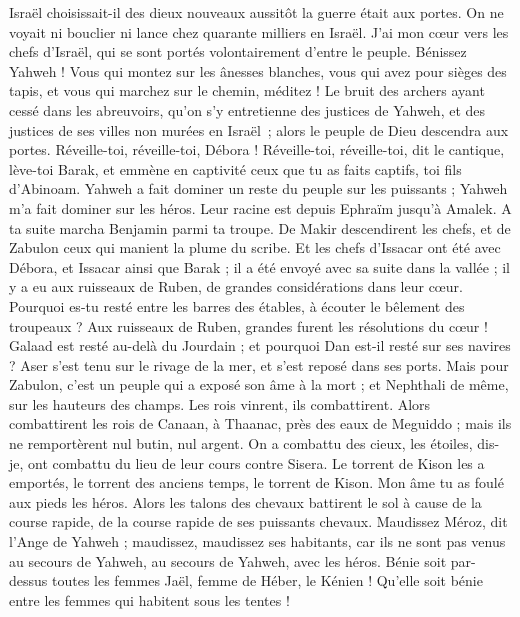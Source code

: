 \begin{multicols}{2}
Israël choisissait-il des dieux nouveaux aussitôt la guerre était aux portes. On ne voyait ni bouclier ni lance chez quarante milliers en Israël.
J’ai mon cœur vers les chefs d'Israël, qui se sont portés volontairement d’entre le peuple. Bénissez Yahweh !
Vous qui montez sur les ânesses blanches, vous qui avez pour sièges des tapis, et vous qui marchez sur le chemin, méditez !
Le bruit des archers ayant cessé dans les abreuvoirs, qu’on s’y entretienne des justices de Yahweh, et des justices de ses villes non murées en Israël ; alors le peuple de Dieu descendra aux portes.
Réveille-toi, réveille-toi, Débora !  Réveille-toi, réveille-toi, dit le cantique, lève-toi Barak, et emmène en captivité ceux que tu as faits captifs, toi fils d'Abinoam.
Yahweh a fait dominer un reste du peuple sur les puissants ; Yahweh m'a fait dominer sur les héros.
Leur racine est depuis Ephraïm jusqu’à Amalek. A ta suite marcha Benjamin parmi ta troupe. De Makir descendirent les chefs, et de Zabulon ceux qui manient la plume du scribe.
Et les chefs d’Issacar ont été avec Débora, et Issacar ainsi que Barak ; il a été envoyé avec sa suite dans la vallée ; il y a eu aux ruisseaux de Ruben, de grandes considérations dans leur cœur.
Pourquoi es-tu resté entre les barres des étables, à écouter le bêlement des troupeaux ? Aux ruisseaux de Ruben, grandes furent les résolutions du cœur !
Galaad est resté au-delà du Jourdain ; et pourquoi Dan est-il resté sur ses navires ? Aser s'est tenu sur le rivage de la mer, et s’est reposé dans ses ports.
Mais pour Zabulon, c'est un peuple qui a exposé son âme à la mort ; et Nephthali de même, sur les hauteurs des champs.
Les rois vinrent, ils combattirent. Alors combattirent les rois de Canaan, à Thaanac, près des eaux de Meguiddo ; mais ils ne remportèrent nul butin, nul argent.
On a combattu des cieux, les étoiles, dis-je, ont combattu du lieu de leur cours contre Sisera.
Le torrent de Kison les a emportés, le torrent des anciens temps, le torrent de Kison. Mon âme tu as foulé aux pieds les héros.
Alors les talons des chevaux battirent le sol à cause de la course rapide, de la course rapide de ses puissants chevaux.
Maudissez Méroz, dit l'Ange de Yahweh ; maudissez, maudissez ses habitants, car ils ne sont pas venus au secours de Yahweh, au secours de Yahweh, avec les héros.
Bénie soit par-dessus toutes les femmes Jaël, femme de Héber, le Kénien ! Qu'elle soit bénie entre les femmes qui habitent sous les tentes !

\end{multicols}

